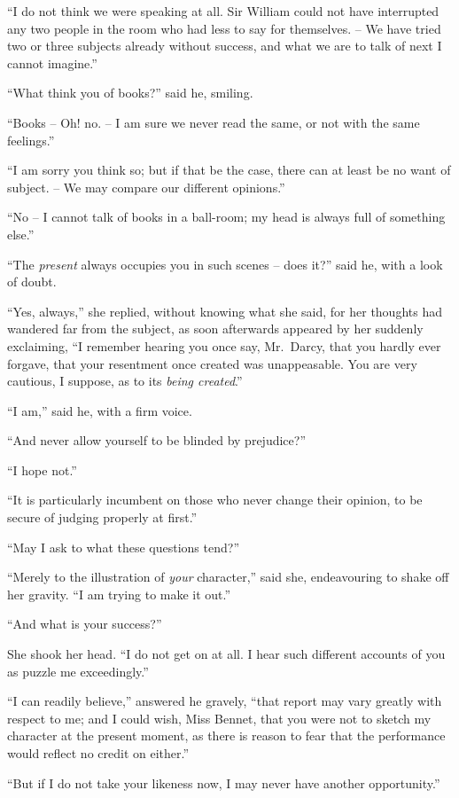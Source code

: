 “I do not think we were speaking at all. Sir William
could not have interrupted any two people in the room
who had less to say for themselves. -- We have tried two
or three subjects already without success, and what we
are to talk of next I cannot imagine.”

“What think you of books?” said he, smiling.

“Books -- Oh! no. -- I am sure we never read the same,
or not with the same feelings.”

“I am sorry you think so; but if that be the case,
there can at least be no want of subject. -- We may
compare our different opinions.”

“No -- I cannot talk of books in a ball-room; my head
is always full of something else.”

“The \textit{present} always occupies you in such scenes -- does
it?” said he, with a look of doubt.

“Yes, always,” she replied, without knowing what she
said, for her thoughts had wandered far from the subject,
as soon afterwards appeared by her suddenly exclaiming,
“I remember hearing you once say, Mr.\ Darcy, that you
hardly ever forgave, that your resentment once created
was unappeasable. You are very cautious, I suppose,
as to its \textit{being created}.”

“I am,” said he, with a firm voice.

“And never allow yourself to be blinded by prejudice?”

“I hope not.”

“It is particularly incumbent on those who never change
their opinion, to be secure of judging properly at first.”

“May I ask to what these questions tend?”

“Merely to the illustration of \textit{your} character,” said she,
endeavouring to shake off her gravity. “I am trying to
make it out.”

“And what is your success?”

She shook her head. “I do not get on at all. I hear
such different accounts of you as puzzle me exceedingly.”

“I can readily believe,” answered he gravely, “that
report may vary greatly with respect to me; and I could
wish, Miss Bennet, that you were not to sketch my
character at the present moment, as there is reason to
fear that the performance would reflect no credit on
either.”

“But if I do not take your likeness now, I may never
have another opportunity.”


